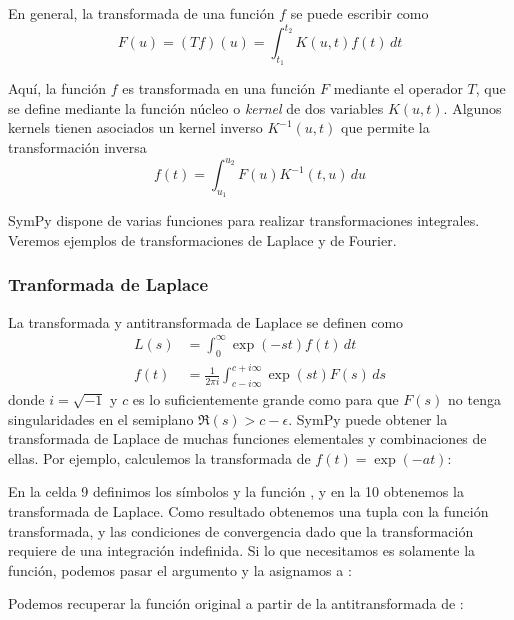 En general, la transformada de una función $f$ se puede escribir como
\begin{equation}\label{eq:intti01}
 F(u) = (Tf)(u) = \int_{t_1}^{t_2} K(u,t) f(t) \, dt
\end{equation} 

Aquí, la función $f$ es transformada en una función $F$ mediante el operador $T$, que se define mediante la función núcleo o \textit{kernel} de dos variables $K(u,t)$. Algunos kernels tienen asociados un kernel inverso $K^{-1}(u,t)$ que permite la transformación inversa
\begin{equation}\label{eq:intti02}
 f(t) = \int_{u_1}^{u_2} F(u) K^{-1}(t, u) \, du
\end{equation} 

SymPy dispone de varias funciones para realizar transformaciones integrales. Veremos ejemplos de transformaciones de Laplace y de Fourier.

\subsubsection{Tranformada de Laplace}
La transformada y antitransformada de Laplace se definen como
\begin{align}\label{eq:intti03}
 L(s) &= \int_0^{\infty} \exp(-st) f(t) \, dt \\
 f(t) &= \frac{1}{2\pi i} \int_{c-i\infty}^{c+i\infty} \exp(st) F(s) \, ds
\end{align} 
donde $i = \sqrt{-1}$ y $c$ es lo suficientemente grande como para que $F(s)$ no tenga singularidades en el semiplano $\Re(s) > c - \epsilon$. SymPy puede obtener la transformada de Laplace de muchas funciones elementales y combinaciones de ellas. Por ejemplo, calculemos la transformada de $f(t) = \exp(-a t)$:

En la celda 9 definimos los símbolos y la función , y en la 10 obtenemos la transformada de Laplace. Como resultado obtenemos una tupla con la función transformada, y las condiciones de convergencia dado que la transformación requiere de una integración indefinida. Si lo que necesitamos es solamente la función, podemos pasar el argumento  y la asignamos a :

Podemos recuperar la función original a partir de la antitransformada de :

